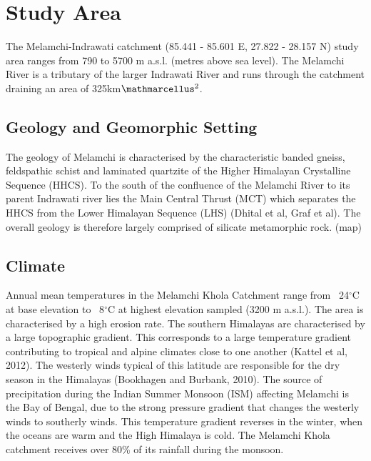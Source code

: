 
\section{Study Area}



The Melamchi-Indrawati catchment (85.441 - 85.601 E, 27.822 - 28.157 N) study area ranges from 790 to 5700 m a.s.l. (metres above sea level). The Melamchi River is a tributary of the larger Indrawati River and runs through the catchment draining an area of 325km$\ttmath{^2}$. 

\subsection{Geology and Geomorphic Setting}


The geology of Melamchi is characterised by the characteristic banded gneiss, feldspathic schist and laminated quartzite of the Higher Himalayan Crystalline Sequence (HHCS). To the south of the confluence of the Melamchi River to its parent Indrawati river lies the Main Central Thrust (MCT) which separates the HHCS from the Lower Himalayan Sequence (LHS) (Dhital et al, Graf et al). The overall geology is therefore largely comprised of silicate metamorphic rock. (map)

\subsection{Climate}

Annual mean temperatures in the Melamchi Khola Catchment range from ~24$^{\circ}$C at base elevation to ~8$^{\circ}$C at highest elevation sampled (3200 m a.s.l.). The area is characterised by a high erosion rate.  The southern Himalayas are characterised by a large topographic gradient. This corresponds to a large temperature gradient contributing to tropical and alpine climates close to one another (Kattel et al, 2012). The westerly winds typical of this latitude are responsible for the dry season in the Himalayas (Bookhagen and Burbank, 2010). The source of precipitation during the Indian Summer Monsoon (ISM) affecting Melamchi is the Bay of Bengal, due to the strong pressure gradient that changes the westerly winds to southerly winds. This temperature gradient reverses in the winter, when the oceans are warm and the High Himalaya is cold.  The Melamchi Khola catchment receives over 80\% of its rainfall during the monsoon.





